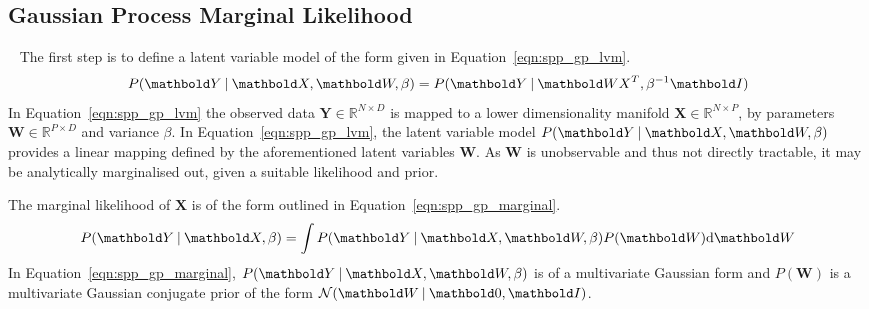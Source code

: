 \subsection{Gaussian Process Marginal Likelihood}
~\label{subsec:spp_gp_marginal_likelihood}
The first step is to define a latent variable model of the form given in Equation~\ref{eqn:spp_gp_lvm}.
\begin{equation}
  \label{eqn:spp_gp_lvm}
  P(\bm{Y} \given \bm{X}, \bm{W}, \beta) = P(\bm{Y} \given \bm{WX}^{T}, \beta^{-1}\bm{I})
\end{equation}
In Equation~\ref{eqn:spp_gp_lvm} the observed data \(\bm{Y} \in \mathbb{R}^{N \times D}\) 
is mapped to a lower dimensionality manifold \(\bm{X} \in \mathbb{R}^{N \times P}\), by parameters 
\(\bm{W} \in \mathbb{R}^{P \times D}\) and variance \( \beta \). In Equation~\ref{eqn:spp_gp_lvm}, 
the latent variable model \( P(\bm{Y} \given \bm{X}, \bm{W}, \beta) \) provides a linear mapping 
defined by the aforementioned latent variables \( \bm{W} \). As \( \bm{W} \) is unobservable and 
thus not directly tractable, it may be analytically marginalised out, given a suitable likelihood 
and prior.

The marginal likelihood of \(\bm{X}\) is of the form outlined in Equation~\ref{eqn:spp_gp_marginal}.
\begin{equation}
  \label{eqn:spp_gp_marginal}
  P(\bm{Y} \given \bm{X}, \beta) = \int P(\bm{Y} \given \bm{X}, \bm{W}, \beta) P(\bm{W}) \intd{\bm{W}}
\end{equation}
In Equation~\ref{eqn:spp_gp_marginal}, \( P(\bm{Y} \given \bm{X}, \bm{W}, \beta) \) is of 
a multivariate Gaussian form and \(P(\bm{W})\) is a multivariate Gaussian conjugate prior of the 
form \(\mathcal{N}(\bm{W} \given \bm{0}, \bm{I})\).

